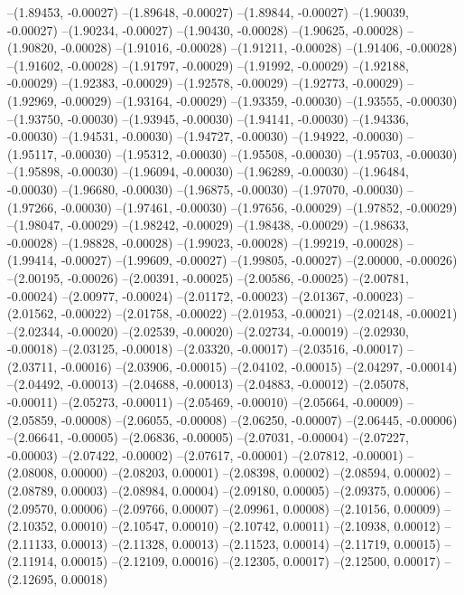 --(1.89453, -0.00027)
--(1.89648, -0.00027)
--(1.89844, -0.00027)
--(1.90039, -0.00027)
--(1.90234, -0.00027)
--(1.90430, -0.00028)
--(1.90625, -0.00028)
--(1.90820, -0.00028)
--(1.91016, -0.00028)
--(1.91211, -0.00028)
--(1.91406, -0.00028)
--(1.91602, -0.00028)
--(1.91797, -0.00029)
--(1.91992, -0.00029)
--(1.92188, -0.00029)
--(1.92383, -0.00029)
--(1.92578, -0.00029)
--(1.92773, -0.00029)
--(1.92969, -0.00029)
--(1.93164, -0.00029)
--(1.93359, -0.00030)
--(1.93555, -0.00030)
--(1.93750, -0.00030)
--(1.93945, -0.00030)
--(1.94141, -0.00030)
--(1.94336, -0.00030)
--(1.94531, -0.00030)
--(1.94727, -0.00030)
--(1.94922, -0.00030)
--(1.95117, -0.00030)
--(1.95312, -0.00030)
--(1.95508, -0.00030)
--(1.95703, -0.00030)
--(1.95898, -0.00030)
--(1.96094, -0.00030)
--(1.96289, -0.00030)
--(1.96484, -0.00030)
--(1.96680, -0.00030)
--(1.96875, -0.00030)
--(1.97070, -0.00030)
--(1.97266, -0.00030)
--(1.97461, -0.00030)
--(1.97656, -0.00029)
--(1.97852, -0.00029)
--(1.98047, -0.00029)
--(1.98242, -0.00029)
--(1.98438, -0.00029)
--(1.98633, -0.00028)
--(1.98828, -0.00028)
--(1.99023, -0.00028)
--(1.99219, -0.00028)
--(1.99414, -0.00027)
--(1.99609, -0.00027)
--(1.99805, -0.00027)
--(2.00000, -0.00026)
--(2.00195, -0.00026)
--(2.00391, -0.00025)
--(2.00586, -0.00025)
--(2.00781, -0.00024)
--(2.00977, -0.00024)
--(2.01172, -0.00023)
--(2.01367, -0.00023)
--(2.01562, -0.00022)
--(2.01758, -0.00022)
--(2.01953, -0.00021)
--(2.02148, -0.00021)
--(2.02344, -0.00020)
--(2.02539, -0.00020)
--(2.02734, -0.00019)
--(2.02930, -0.00018)
--(2.03125, -0.00018)
--(2.03320, -0.00017)
--(2.03516, -0.00017)
--(2.03711, -0.00016)
--(2.03906, -0.00015)
--(2.04102, -0.00015)
--(2.04297, -0.00014)
--(2.04492, -0.00013)
--(2.04688, -0.00013)
--(2.04883, -0.00012)
--(2.05078, -0.00011)
--(2.05273, -0.00011)
--(2.05469, -0.00010)
--(2.05664, -0.00009)
--(2.05859, -0.00008)
--(2.06055, -0.00008)
--(2.06250, -0.00007)
--(2.06445, -0.00006)
--(2.06641, -0.00005)
--(2.06836, -0.00005)
--(2.07031, -0.00004)
--(2.07227, -0.00003)
--(2.07422, -0.00002)
--(2.07617, -0.00001)
--(2.07812, -0.00001)
--(2.08008, 0.00000)
--(2.08203, 0.00001)
--(2.08398, 0.00002)
--(2.08594, 0.00002)
--(2.08789, 0.00003)
--(2.08984, 0.00004)
--(2.09180, 0.00005)
--(2.09375, 0.00006)
--(2.09570, 0.00006)
--(2.09766, 0.00007)
--(2.09961, 0.00008)
--(2.10156, 0.00009)
--(2.10352, 0.00010)
--(2.10547, 0.00010)
--(2.10742, 0.00011)
--(2.10938, 0.00012)
--(2.11133, 0.00013)
--(2.11328, 0.00013)
--(2.11523, 0.00014)
--(2.11719, 0.00015)
--(2.11914, 0.00015)
--(2.12109, 0.00016)
--(2.12305, 0.00017)
--(2.12500, 0.00017)
--(2.12695, 0.00018)
